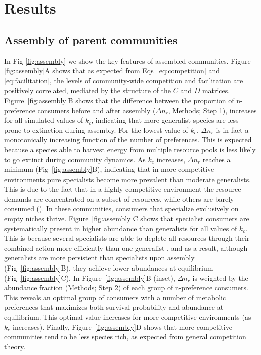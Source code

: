 \documentclass[10pt,letterpaper]{article}
\begin{document}
\section*{Results}

\subsection*{Assembly of parent communities}

In Fig \ref{fig:assembly} we show the key features of assembled communities. Figure \ref{fig:assembly}A shows that as expected from Eqs~\ref{eq:competition} and \ref{eq:facilitation}, the levels of community-wide competition and facilitation are positively correlated, mediated by the structure of the $C$ and $D$ matrices. Figure~\ref{fig:assembly}B shows that the difference between the proportion of n-preference consumers before and after assembly ($\Delta{n_r}$, Methods; Step 1), increases for all simulated values of $k_c$, indicating that more generalist species are less prone to extinction during assembly. For the lowest value of $k_c$, $\Delta{n_r}$ is in fact a monotonically increasing function of the number of preferences. This is expected because a species able to harvest energy from multiple resource pools is less likely to go extinct during community dynamics. As $k_c$ increases, $\Delta{n_r}$ reaches a minimum  (Fig~\ref{fig:assembly}B), indicating that in more competitive environments pure specialists become more prevalent than moderate generalists. This is due to the fact that in a highly competitive environment the resource demands are concentrated on a subset of resources, while others are barely consumed (). In these communities, consumers that specialize exclusively on empty niches thrive. Figure~\ref{fig:assembly}C shows that specialist consumers are systematically present in higher abundance than generalists for all values of $k_c$. This is because several specialists are able to deplete all resources through their combined action more efficiently than one generalist \cite{Pascual-Garcia2020}, and as a result, although generalists are more persistent than specialists upon assembly (Fig~\ref{fig:assembly}B), they achieve lower abundances at equilibrium (Fig~\ref{fig:assembly}C). In Figure~\ref{fig:assembly}B (inset), $\Delta{n_r}$ is weighted by the abundance fraction (Methods; Step 2) of each group of n-preference consumers. This reveals an optimal group of consumers with a number of metabolic preferences that maximizes both survival probability and abundance at equilibrium. This optimal value increases for more competitive environments (as $k_c$ increases). Finally, Figure~\ref{fig:assembly}D shows that more competitive communities tend to be less species rich, as expected from general competition theory.
\end{document}
